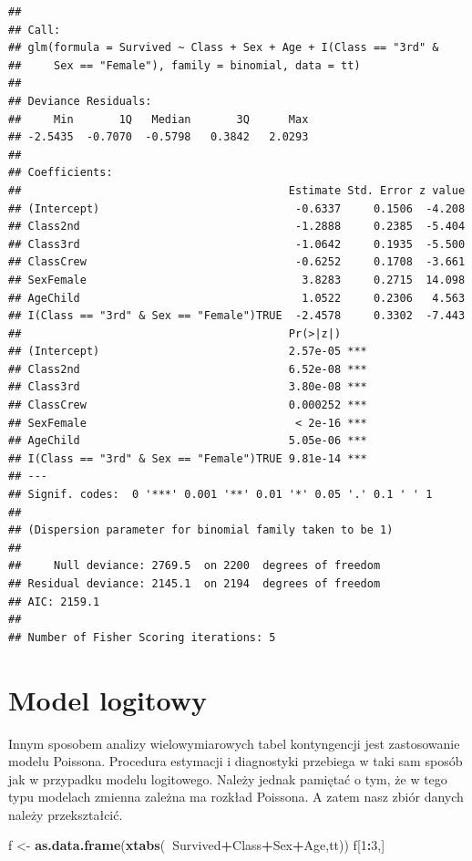 \documentclass[polish,]{book}
\newenvironment{Shaded}{\begin{snugshade}}{\end{snugshade}}
\newcommand{\DecValTok}[1]{\textcolor[rgb]{0.00,0.00,0.81}{#1}}
\newcommand{\KeywordTok}[1]{\textcolor[rgb]{0.13,0.29,0.53}{\textbf{#1}}}
\newcommand{\NormalTok}[1]{#1}
\newcommand{\OperatorTok}[1]{\textcolor[rgb]{0.81,0.36,0.00}{\textbf{#1}}}
\newcommand{\StringTok}[1]{\textcolor[rgb]{0.31,0.60,0.02}{#1}}
\begin{document}
\begin{verbatim}
## 
## Call:
## glm(formula = Survived ~ Class + Sex + Age + I(Class == "3rd" & 
##     Sex == "Female"), family = binomial, data = tt)
## 
## Deviance Residuals: 
##     Min       1Q   Median       3Q      Max  
## -2.5435  -0.7070  -0.5798   0.3842   2.0293  
## 
## Coefficients:
##                                         Estimate Std. Error z value
## (Intercept)                              -0.6337     0.1506  -4.208
## Class2nd                                 -1.2888     0.2385  -5.404
## Class3rd                                 -1.0642     0.1935  -5.500
## ClassCrew                                -0.6252     0.1708  -3.661
## SexFemale                                 3.8283     0.2715  14.098
## AgeChild                                  1.0522     0.2306   4.563
## I(Class == "3rd" & Sex == "Female")TRUE  -2.4578     0.3302  -7.443
##                                         Pr(>|z|)    
## (Intercept)                             2.57e-05 ***
## Class2nd                                6.52e-08 ***
## Class3rd                                3.80e-08 ***
## ClassCrew                               0.000252 ***
## SexFemale                                < 2e-16 ***
## AgeChild                                5.05e-06 ***
## I(Class == "3rd" & Sex == "Female")TRUE 9.81e-14 ***
## ---
## Signif. codes:  0 '***' 0.001 '**' 0.01 '*' 0.05 '.' 0.1 ' ' 1
## 
## (Dispersion parameter for binomial family taken to be 1)
## 
##     Null deviance: 2769.5  on 2200  degrees of freedom
## Residual deviance: 2145.1  on 2194  degrees of freedom
## AIC: 2159.1
## 
## Number of Fisher Scoring iterations: 5
\end{verbatim}

\hypertarget{part_84}{%
\section{Model logitowy}\label{part_84}}

Innym sposobem analizy wielowymiarowych tabel kontyngencji jest zastosowanie
modelu Poissona. Procedura estymacji i diagnostyki przebiega w taki sam sposób
jak w przypadku modelu logitowego. Należy jednak pamiętać o tym, że w tego typu
modelach zmienna zależna ma rozkład Poissona. A zatem nasz zbiór danych należy
przekształcić.

\begin{Shaded}
\begin{Highlighting}[]
\NormalTok{f <-}\StringTok{ }\KeywordTok{as.data.frame}\NormalTok{(}\KeywordTok{xtabs}\NormalTok{(}\OperatorTok{~}\NormalTok{Survived}\OperatorTok{+}\NormalTok{Class}\OperatorTok{+}\NormalTok{Sex}\OperatorTok{+}\NormalTok{Age,tt))}
\NormalTok{f[}\DecValTok{1}\OperatorTok{:}\DecValTok{3}\NormalTok{,]}
\end{Highlighting}
\end{Shaded}
\end{document}
